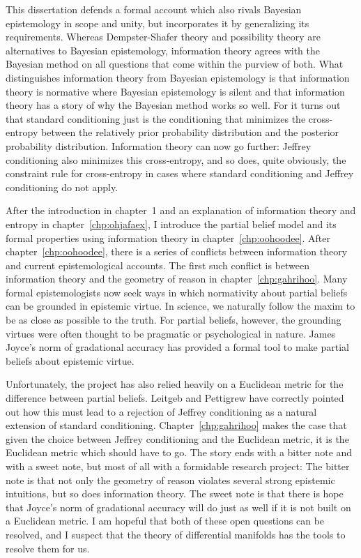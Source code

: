 \documentclass[phd,12pt,oneside]{ubcthesis}
\begin{document}
This dissertation defends a formal account which also rivals Bayesian
epistemology in scope and unity, but incorporates it by generalizing
its requirements. Whereas Dempster-Shafer theory and possibility
theory are alternatives to Bayesian epistemology, information theory
agrees with the Bayesian method on all questions that come within the
purview of both. What distinguishes information theory from Bayesian
epistemology is that information theory is normative where Bayesian
epistemology is silent and that information theory has a story of why
the Bayesian method works so well. For it turns out that standard
conditioning just is the conditioning that minimizes the cross-entropy
between the relatively prior probability distribution and the
posterior probability distribution. Information theory can now go
further: Jeffrey conditioning also minimizes this cross-entropy, and
so does, quite obviously, the constraint rule for cross-entropy in
cases where standard conditioning and Jeffrey conditioning do not
apply.

After the introduction in chapter~1 and an explanation of information
theory and entropy in chapter~\ref{chp:ohjafaex}, I introduce the
partial belief model and its formal properties using information
theory in chapter~\ref{chp:oohoodee}. After
chapter~\ref{chp:oohoodee}, there is a series of conflicts between
information theory and current epistemological accounts. The first
such conflict is between information theory and the geometry of reason
in chapter~\ref{chp:gahrihoo}. Many formal epistemologists now seek
ways in which normativity about partial beliefs can be grounded in
epistemic virtue. In science, we naturally follow the maxim to be as
close as possible to the truth. For partial beliefs, however, the
grounding virtues were often thought to be pragmatic or psychological
in nature. James Joyce's norm of gradational accuracy has provided a
formal tool to make partial beliefs about epistemic virtue.

Unfortunately, the project has also relied heavily on a Euclidean
metric for the difference between partial beliefs. Leitgeb and
Pettigrew have correctly pointed out how this must lead to a rejection
of Jeffrey conditioning as a natural extension of standard
conditioning. Chapter~\ref{chp:gahrihoo} makes the case that given the
choice between Jeffrey conditioning and the Euclidean metric, it is
the Euclidean metric which should have to go. The story ends with a
bitter note and with a sweet note, but most of all with a formidable
research project: The bitter note is that not only the geometry of
reason violates several strong epistemic intuitions, but so does
information theory. The sweet note is that there is hope that Joyce's
norm of gradational accuracy will do just as well if it is not built
on a Euclidean metric. I am hopeful that both of these open questions
can be resolved, and I suspect that the theory of differential
manifolds has the tools to resolve them for us.
\end{document}
